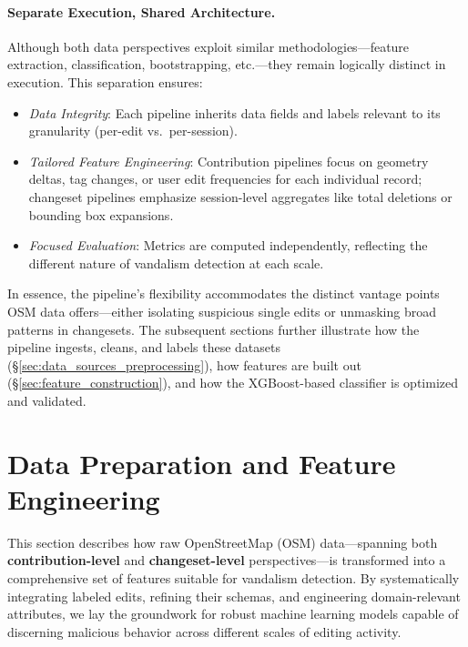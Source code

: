 \documentclass[
    13pt, %
    a4paper, %
    DIV14, %
    listof=totoc, %
    bibliography=totoc, %
    index=totoc, %
    headsepline
]{scrreprt}
\begin{document}
\paragraph{Separate Execution, Shared Architecture.}
Although both data perspectives exploit similar methodologies—feature extraction, classification, bootstrapping, etc.—they remain logically distinct in execution. This separation ensures:
\begin{itemize}
    \item \textit{Data Integrity}: Each pipeline inherits data fields and labels relevant to its granularity (per-edit vs.\ per-session).
    \item \textit{Tailored Feature Engineering}: Contribution pipelines focus on geometry deltas, tag changes, or user edit frequencies for each individual record; changeset pipelines emphasize session-level aggregates like total deletions or bounding box expansions.
    \item \textit{Focused Evaluation}: Metrics are computed independently, reflecting the different nature of vandalism detection at each scale.
\end{itemize}

\noindent
In essence, the pipeline’s flexibility accommodates the distinct vantage points OSM data offers—either isolating suspicious single edits or unmasking broad patterns in changesets. The subsequent sections further illustrate how the pipeline ingests, cleans, and labels these datasets (\S\ref{sec:data_sources_preprocessing}), how features are built out (\S\ref{sec:feature_construction}), and how the XGBoost-based classifier is optimized and validated.


\vspace{1em}

\section{Data Preparation and Feature Engineering}
\label{sec:data_preparation}

This section describes how raw OpenStreetMap (OSM) data—spanning both \textbf{contribution-level} and \textbf{changeset-level} perspectives—is transformed into a comprehensive set of features suitable for vandalism detection. By systematically integrating labeled edits, refining their schemas, and engineering domain-relevant attributes, we lay the groundwork for robust machine learning models capable of discerning malicious behavior across different scales of editing activity.
\end{document}
